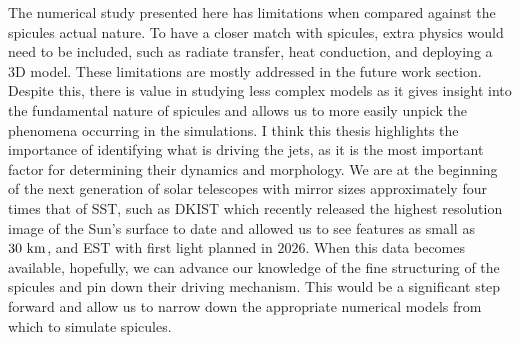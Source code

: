 %
The numerical study presented here has limitations when compared against the spicules actual nature. To have a closer match with spicules, extra physics would need to be included, such as radiate transfer, heat conduction, and deploying a 3D model. These limitations are mostly addressed in the future work section. Despite this, there is value in studying less complex models as it gives insight into the fundamental nature of spicules and allows us to more easily unpick the phenomena occurring in the simulations. I think this thesis highlights the importance of identifying what is driving the jets, as it is the most important factor for determining their dynamics and morphology. We are at the beginning of the next generation of solar telescopes with mirror sizes approximately four times that of SST, such as DKIST  which recently released the highest resolution image of the Sun's surface to date and allowed us to see features as small as $30~\rm{km}$, and EST with first light planned in $2026$. When this data becomes available, hopefully, we can advance our knowledge of the fine structuring of the spicules and pin down their driving mechanism. This would be a significant step forward and allow us to narrow down the appropriate numerical models from which to simulate spicules. 
